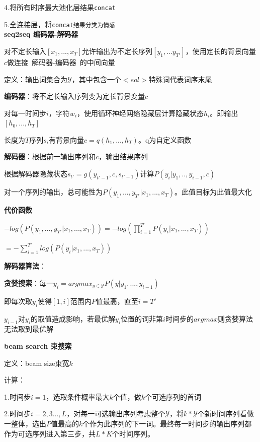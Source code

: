 \documentclass[UTF8]{ctexart}
\begin{document}
  \quad 4.将所有时序最大池化层结果\texttt{concat}

  \quad 5.全连接层，将\texttt{concat结果分类为情感}\\
\textbf{seq2seq 编码器-解码器}

  对不定长输入$[x_1, ..., x_T]$允许输出为不定长序列$[y_1,...y_{T'}]$，使用定长的背景向量$c$做连接\ 解码器-编码器\ 的中间向量

  定义：输出词集合为$\mathcal{Y} $，其中包含一个$<eol>$特殊词代表词序末尾

  \textbf{编码器}：将不定长输入序列变为定长背景变量$c$

  \quad 对每一时间步$i$，字符$w_i$，使用循环神经网络隐藏层计算隐藏状态$h_i$。即输出$[h_0, ..., h_T]$

  \quad 长度为$T$序列$s_i$有背景向量$c = q(h_1, ..., h_T)$。q为自定义函数

  \textbf{解码器}：根据前一输出序列和$c$，输出结果序列

  \quad 根据解码器隐藏状态$s_{t'} = g(y_{t'-1}, c, s_{t'-1})$计算$P(y_i | y_{1}, .., y_{i-1}, c)$
  
  \quad 对一个序列的输出，总可能性为$ P(y_1,...,y_{T'} | x_1, ..., x_T)$。此值目标为此值最大化

  \textbf{代价函数}

  \quad $-log(P(y_1,...,y_{T'} | x_1, ..., x_T)) = -log(\prod_{i=1}^{T'} P(y_i | x_1, ..., x_T))$

  \quad \quad $ = -\sum_{i=1}^{T'}log(P(y_i | x_1, ..., x_T))$
  
  \textbf{解码器算法}：

  \quad \textbf{贪婪搜索}：每一$y_i = argmax_{y\in \mathcal{Y} }P(y|y_1, ..., y_{i-1})$

  \quad \quad 即每次取$y_i$使得$[1, i]$范围内$P$值最高，直至$i = T'$

  \quad \quad $y_{i-1}$对$y_i$的取值造成影响，若最优解$y_i$位置的词非第$i$时间步的$argmax$则贪婪算法无法取到最优解

  \textbf{beam search 束搜索}
  
  \quad 定义：beam size束宽$k$

  \quad 计算：
  
  \quad \quad 1.时间步$i = 1$，选取条件概率最大$k$个值，做$k$个可选序列的首词
  
  \quad \quad 2.时间步$i = 2,3...,L$，对每一可选输出序列考虑整个$\mathcal{Y} $，将$k*\mathcal{Y} $个新时间序列看做一整体，选出$P$值最高的$k$个作为此序列的下一词。最终每一时间步的输出序列都作为可选序列进入第三步，共$L*K$个时间序列。
  
\end{document}
